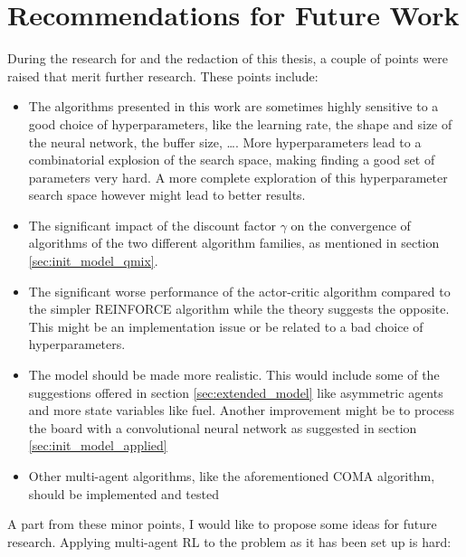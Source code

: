 \chapter{Recommendations for Future Work}
\label{ch:future_work}
During the research for and the redaction of this thesis, a couple of points were raised that merit further research. These points include:
\begin{itemize}
    \item The algorithms presented in this work are sometimes highly sensitive to a good choice of hyperparameters, like the learning rate, the shape and size of the neural network, the buffer size, \ldots. More hyperparameters lead to a combinatorial explosion of the search space, making finding a good set of parameters very hard. A more complete exploration of this hyperparameter search space however might lead to better results.
    \item The significant impact of the discount factor $\gamma$ on the convergence of algorithms of the two different algorithm families, as mentioned in section \ref{sec:init_model_qmix}.
    \item The significant worse performance of the actor-critic algorithm compared to the simpler REINFORCE algorithm while the theory suggests the opposite. This might be an implementation issue or be related to a bad choice of hyperparameters.
    \item The model should be made more realistic. This would include some of the suggestions offered in section \ref{sec:extended_model} like asymmetric agents and more state variables like fuel. Another improvement might be to process the board with a convolutional neural network as suggested in section \ref{sec:init_model_applied}
    \item Other multi-agent algorithms, like the aforementioned COMA algorithm, should be implemented and tested
\end{itemize}
A part from these minor points, I would like to propose some ideas for future research. Applying multi-agent RL to the problem as it has been set up is hard:
